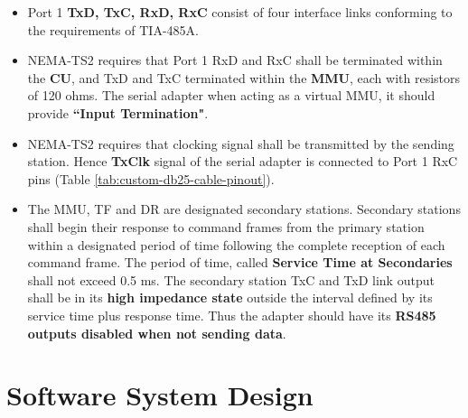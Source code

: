 \documentclass[]{article}
\begin{document}
\begin{itemize}
	\item Port 1 \textbf{TxD, TxC, RxD, RxC} consist of four interface links conforming to the requirements of TIA-485A.
	
	\item NEMA-TS2 requires that Port 1 RxD and RxC shall be terminated within the \textbf{CU}, and TxD and TxC terminated within the \textbf{MMU}, each with resistors of 120 ohms. The serial adapter when acting as a virtual MMU, it should provide \textbf{``Input Termination"}.
	
	\item NEMA-TS2 requires that clocking signal shall be transmitted by the sending station. Hence \textbf{TxClk} signal of the serial adapter is connected to Port 1 RxC pins (Table \ref{tab:custom-db25-cable-pinout}).
	
	\item The MMU, TF and DR are designated secondary stations. Secondary stations shall begin their response to command frames from the primary station within a designated period of time following the complete reception of each command frame. The period of time, called \textbf{Service Time at Secondaries} shall not exceed 0.5 ms. The secondary station TxC and TxD link output shall be in its \textbf{high impedance state} outside the interval defined by its service time plus response time. Thus the adapter should have its \textbf{RS485 outputs disabled when not sending data}.	
\end{itemize}

\clearpage

\section{Software System Design}
\clearpage
\end{document}
